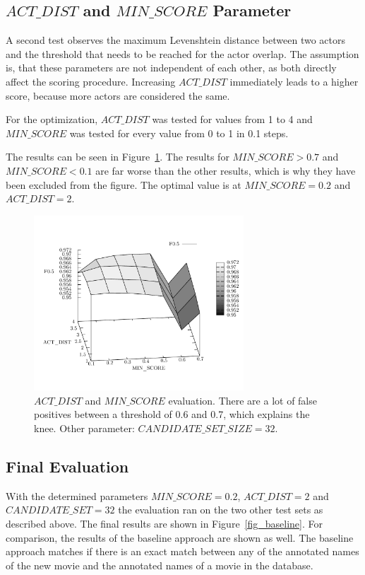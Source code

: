 \subsection{$ACT\_DIST$ and $MIN\_SCORE$ Parameter}
A second test observes the maximum Levenshtein distance between two actors and the threshold that needs to be reached for the actor overlap.
The assumption is, that these parameters are not independent of each other, as both directly affect the scoring procedure.
Increasing $ACT\_DIST$ immediately leads to a higher score, because more actors are considered the same.

For the optimization, $ACT\_DIST$ was tested for values from 1 to 4 and $MIN\_SCORE$ was tested for every value from 0 to 1 in 0.1 steps.

The results can be seen in Figure~\ref{fig_3d}.
The results for $MIN\_SCORE > 0.7$ and $MIN\_SCORE < 0.1$ are far worse than the other results, which is why they have been excluded from the figure.
The optimal value is at $MIN\_SCORE = 0.2$ and $ACT\_DIST = 2$.

\begin{figure}[h!]
  \begin{center}
  \includegraphics[width=0.7\textwidth]{images/3d.pdf}
  \end{center}
  \caption{$ACT\_DIST$  and $MIN\_SCORE$ evaluation. There are a lot of false positives between a threshold of 0.6 and 0.7, which explains the knee. Other parameter: $CANDIDATE\_SET\_SIZE = 32$.}
  \label{fig_3d}
\end{figure}

\subsection{Final Evaluation}
With the determined parameters $MIN\_SCORE = 0.2$, $ACT\_DIST = 2$ and $CANDIDATE\_SET = 32$ the evaluation ran on the two other test sets as described above.
The final results are shown in Figure~\ref{fig_baseline}.
For comparison, the results of the baseline approach are shown as well.
The baseline approach matches if there is an exact match between any of the annotated names of the new movie and the annotated names of a movie in the database.

